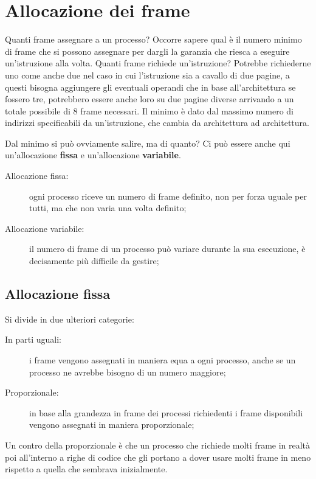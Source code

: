 \documentclass[a4paper, 12pt]{book}
\begin{document}
\chapter{Allocazione dei frame}

Quanti frame assegnare a un processo? Occorre sapere qual è il numero minimo di frame che si possono assegnare per dargli la garanzia 
che riesca a eseguire un'istruzione alla volta. Quanti frame richiede un'istruzione? Potrebbe richiederne uno come anche due nel 
caso in cui l'istruzione sia a cavallo di due pagine, a questi bisogna aggiungere gli eventuali operandi che in base all'architettura 
se fossero tre, potrebbero essere anche loro  su due pagine diverse arrivando a un totale possibile di 8 frame necessari. Il minimo 
è dato dal massimo numero di indirizzi specificabili da un'istruzione, che cambia da architettura ad architettura.

Dal minimo si può ovviamente salire, ma di quanto? Ci può essere anche qui un'allocazione \textbf{fissa} e un'allocazione \textbf{variabile}. 

\begin{description}
    \item[Allocazione fissa:] ogni processo riceve un numero di frame definito, non per forza uguale per tutti, ma che non varia una volta definito;
    \item[Allocazione variabile:] il numero di frame di un processo può variare durante la sua esecuzione, è decisamente più difficile da gestire; 
\end{description}

\section{Allocazione fissa}

Si divide in due ulteriori categorie:

\begin{description}
    \item[In parti uguali:] i frame vengono assegnati in maniera equa a ogni processo, anche se un processo ne avrebbe bisogno di un numero maggiore;
    \item[Proporzionale:] in base alla grandezza in frame dei processi richiedenti i frame disponibili vengono assegnati in maniera proporzionale;  
\end{description}
Un contro della proporzionale è che un processo che richiede molti frame in realtà poi all'interno a righe di codice che gli portano 
a dover usare molti frame in meno rispetto a quella che sembrava inizialmente. 
\end{document}
